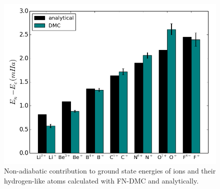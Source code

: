 \documentclass[pra,superscriptaddress,groupedaddress,twocolumn]{revtex4}
\begin{document}
\begin{figure}[h]
\includegraphics[scale=.4]{Figures/analytical}
\caption{Non-adiabatic contribution to ground state energies of ions and their hydrogen-like atoms calculated with FN-DMC and analytically. \label{fig:analytical}}
\end{figure}
\end{document}
